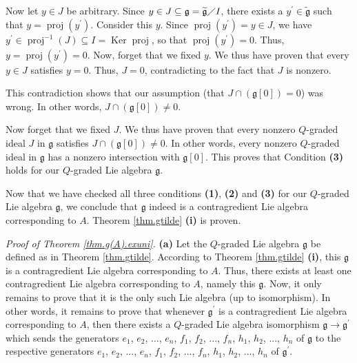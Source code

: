 \documentclass[etingof-lie.tex]{subfiles}
\begin{document}
Now let $y\in J$ be arbitrary. Since $y\in J\subseteq\mathfrak{g}%
=\widetilde{\mathfrak{g}}\diagup I$, there exists a $y^{\prime}\in
\widetilde{\mathfrak{g}}$ such that $y=\operatorname*{proj}\left(  y^{\prime
}\right)  $. Consider this $y$. Since $\operatorname*{proj}\left(  y^{\prime
}\right)  =y\in J$, we have $y^{\prime}\in\operatorname*{proj}\nolimits^{-1}%
\left(  J\right)  \subseteq I=\operatorname*{Ker}\operatorname*{proj}$, so
that $\operatorname*{proj}\left(  y^{\prime}\right)  =0$. Thus,
$y=\operatorname*{proj}\left(  y^{\prime}\right)  =0$. Now, forget that we
fixed $y$. We thus have proven that every $y\in J$ satisfies $y=0$. Thus,
$J=0$, contradicting to the fact that $J$ is nonzero.

This contradiction shows that our assumption (that $J\cap\left(
\mathfrak{g}\left[  0\right]  \right)  =0$) was wrong. In other words,
$J\cap\left(  \mathfrak{g}\left[  0\right]  \right)  \neq0$.

Now forget that we fixed $J$. We thus have proven that every nonzero
$Q$-graded ideal $J$ in $\mathfrak{g}$ satisfies $J\cap\left(  \mathfrak{g}%
\left[  0\right]  \right)  \neq0$. In other words, every nonzero $Q$-graded
ideal in $\mathfrak{g}$ has a nonzero intersection with $\mathfrak{g}\left[
0\right]  $. This proves that Condition \textbf{(3)} holds for our $Q$-graded
Lie algebra $\mathfrak{g}$.

Now that we have checked all three conditions \textbf{(1)}, \textbf{(2)} and
\textbf{(3)} for our $Q$-graded Lie algebra $\mathfrak{g}$, we conclude that
$\mathfrak{g}$ indeed is a contragredient Lie algebra corresponding to $A$.
Theorem \ref{thm.gtilde} \textbf{(i)} is proven.

\bigskip

\textit{Proof of Theorem \ref{thm.g(A).exuni}.} \textbf{(a)} Let the
$Q$-graded Lie algebra $\mathfrak{g}$ be defined as in Theorem
\ref{thm.gtilde}. According to Theorem \ref{thm.gtilde} \textbf{(i)}, this
$\mathfrak{g}$ is a contragredient Lie algebra corresponding to $A$. Thus,
there exists at least one contragredient Lie algebra corresponding to $A$,
namely this $\mathfrak{g}$. Now, it only remains to prove that it is the only
such Lie algebra (up to isomorphism). In other words, it remains to prove that
whenever $\mathfrak{g}^{\prime}$ is a contragredient Lie algebra corresponding
to $A$, then there exists a $Q$-graded Lie algebra isomorphism $\mathfrak{g}%
\rightarrow\mathfrak{g}^{\prime}$ which sends the generators $e_{1}$, $e_{2}$,
$...$, $e_{n}$, $f_{1}$, $f_{2}$, $...$, $f_{n}$, $h_{1}$, $h_{2}$, $...$,
$h_{n}$ of $\mathfrak{g}$ to the respective generators $e_{1}$, $e_{2}$,
$...$, $e_{n}$, $f_{1}$, $f_{2}$, $...$, $f_{n}$, $h_{1}$, $h_{2}$, $...$,
$h_{n}$ of $\mathfrak{g}^{\prime}$.
\end{document}
